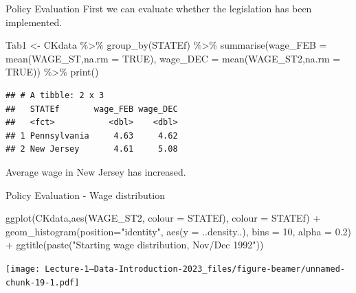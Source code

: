 \documentclass[
  ignorenonframetext,
]{beamer}
\newenvironment{Shaded}{\begin{snugshade}}{\end{snugshade}}
\newcommand{\AttributeTok}[1]{\textcolor[rgb]{0.77,0.63,0.00}{#1}}
\newcommand{\ConstantTok}[1]{\textcolor[rgb]{0.00,0.00,0.00}{#1}}
\newcommand{\DecValTok}[1]{\textcolor[rgb]{0.00,0.00,0.81}{#1}}
\newcommand{\FloatTok}[1]{\textcolor[rgb]{0.00,0.00,0.81}{#1}}
\newcommand{\FunctionTok}[1]{\textcolor[rgb]{0.00,0.00,0.00}{#1}}
\newcommand{\NormalTok}[1]{#1}
\newcommand{\OtherTok}[1]{\textcolor[rgb]{0.56,0.35,0.01}{#1}}
\newcommand{\SpecialCharTok}[1]{\textcolor[rgb]{0.00,0.00,0.00}{#1}}
\newcommand{\StringTok}[1]{\textcolor[rgb]{0.31,0.60,0.02}{#1}}
\begin{document}
\begin{frame}[fragile]{Policy Evaluation}
\protect\hypertarget{policy-evaluation}{}
First we can evaluate whether the legislation has been implemented.

\footnotesize

\begin{Shaded}
\begin{Highlighting}[]
\NormalTok{Tab1 }\OtherTok{\textless{}{-}}\NormalTok{ CKdata }\SpecialCharTok{\%\textgreater{}\%} \FunctionTok{group\_by}\NormalTok{(STATEf) }\SpecialCharTok{\%\textgreater{}\%} 
          \FunctionTok{summarise}\NormalTok{(}\AttributeTok{wage\_FEB =} \FunctionTok{mean}\NormalTok{(WAGE\_ST,}\AttributeTok{na.rm =} \ConstantTok{TRUE}\NormalTok{), }
                    \AttributeTok{wage\_DEC =} \FunctionTok{mean}\NormalTok{(WAGE\_ST2,}\AttributeTok{na.rm =} \ConstantTok{TRUE}\NormalTok{)) }\SpecialCharTok{\%\textgreater{}\%} 
          \FunctionTok{print}\NormalTok{()}
\end{Highlighting}
\end{Shaded}

\begin{verbatim}
## # A tibble: 2 x 3
##   STATEf       wage_FEB wage_DEC
##   <fct>           <dbl>    <dbl>
## 1 Pennsylvania     4.63     4.62
## 2 New Jersey       4.61     5.08
\end{verbatim}

Average wage in New Jersey has increased.

\normalsize
\end{frame}

\begin{frame}[fragile]{Policy Evaluation - Wage distribution}
\protect\hypertarget{policy-evaluation---wage-distribution}{}
\footnotesize

\begin{Shaded}
\begin{Highlighting}[]
\FunctionTok{ggplot}\NormalTok{(CKdata,}\FunctionTok{aes}\NormalTok{(WAGE\_ST2, }\AttributeTok{colour =}\NormalTok{ STATEf), }\AttributeTok{colour =}\NormalTok{ STATEf) }\SpecialCharTok{+} 
    \FunctionTok{geom\_histogram}\NormalTok{(}\AttributeTok{position=}\StringTok{"identity"}\NormalTok{, }
                   \FunctionTok{aes}\NormalTok{(}\AttributeTok{y =}\NormalTok{ ..density..),}
                   \AttributeTok{bins =} \DecValTok{10}\NormalTok{,}
                   \AttributeTok{alpha =} \FloatTok{0.2}\NormalTok{) }\SpecialCharTok{+}
    \FunctionTok{ggtitle}\NormalTok{(}\FunctionTok{paste}\NormalTok{(}\StringTok{"Starting wage distribution, Nov/Dec 1992"}\NormalTok{))}
\end{Highlighting}
\end{Shaded}

\texttt{[image: Lecture-1---Data-Introduction-2023\_files/figure-beamer/unnamed-chunk-19-1.pdf]}
\normalsize
\end{frame}
\end{document}
